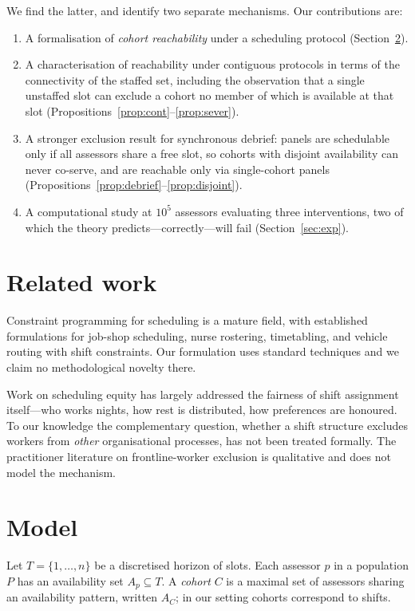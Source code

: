 \documentclass[11pt]{article}
\theoremstyle{definition}
\begin{document}
We find the latter, and identify two separate mechanisms. Our contributions are:

\begin{enumerate}
  \item A formalisation of \emph{cohort reachability} under a scheduling protocol
        (Section~\ref{sec:model}).
  \item A characterisation of reachability under contiguous protocols in terms of the
        connectivity of the staffed set, including the observation that a single
        unstaffed slot can exclude a cohort no member of which is available at that slot
        (Propositions~\ref{prop:cont}--\ref{prop:sever}).
  \item A stronger exclusion result for synchronous debrief: panels are schedulable only
        if all assessors share a free slot, so cohorts with disjoint availability can
        never co-serve, and are reachable only via single-cohort panels
        (Propositions~\ref{prop:debrief}--\ref{prop:disjoint}).
  \item A computational study at $10^5$ assessors evaluating three interventions, two of
        which the theory predicts---correctly---will fail (Section~\ref{sec:exp}).
\end{enumerate}

\section{Related work}

Constraint programming for scheduling is a mature field, with established formulations for
job-shop scheduling, nurse rostering, timetabling, and vehicle routing with shift
constraints. Our formulation uses standard techniques and we claim no methodological
novelty there.

Work on scheduling equity has largely addressed the fairness of shift assignment
itself---who works nights, how rest is distributed, how preferences are honoured. To our
knowledge the complementary question, whether a shift structure excludes workers from
\emph{other} organisational processes, has not been treated formally. The practitioner
literature on frontline-worker exclusion is qualitative and does not model the mechanism.

\section{Model}
\label{sec:model}

Let $T=\{1,\dots,n\}$ be a discretised horizon of slots. Each assessor $p$ in a population
$P$ has an availability set $A_p \subseteq T$. A \emph{cohort} $C$ is a maximal set of
assessors sharing an availability pattern, written $A_C$; in our setting cohorts
correspond to shifts.
\end{document}
